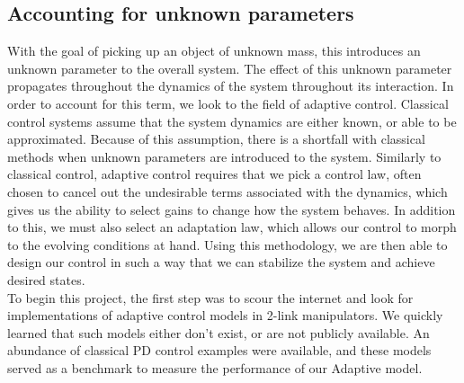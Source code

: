 \subsection*{Accounting for unknown parameters}
With the goal of picking up an object of unknown mass, this introduces an unknown parameter to the overall system.
The effect of this unknown parameter propagates throughout the dynamics of the system throughout its interaction.
In order to account for this term, we look to the field of adaptive control.
Classical control systems assume that the system dynamics are either known, or able to be approximated.
Because of this assumption, there is a shortfall with classical methods when unknown parameters are introduced to the system.
Similarly to classical control, adaptive control requires that we pick a control law, often chosen to cancel out the undesirable terms associated with the dynamics, which gives us the ability to select gains to change how the system behaves.
In addition to this, we must also select an adaptation law, which allows our control to morph to the evolving conditions at hand.
Using this methodology, we are then able to design our control in such a way that we can stabilize the system and achieve desired states.\\

To begin this project, the first step was to scour the internet and look for implementations of adaptive control models in 2-link manipulators.
We quickly learned that such models either don't exist, or are not publicly available.
An abundance of classical PD control examples were available, and these models served as a benchmark to measure the performance of our Adaptive model.
